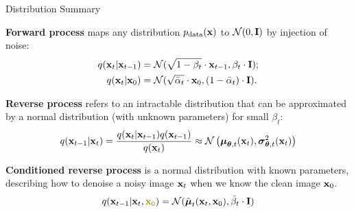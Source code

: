 \documentclass{beamer}
\renewcommand{\eqpause}{}
\begin{document}
\begin{frame}{Distribution Summary}

    \textbf{Forward process} maps any distribution $p_{\text{data}}(\mathbf{x})$ to $\mathcal{N}(0, \mathbf{I})$ by injection of noise:
    \begin{align*}
        q(\mathbf{x}_t | \mathbf{x}_{t-1}) &= \mathcal{N}(\sqrt{1 - \beta_t} \cdot \mathbf{x}_{t-1}, \beta_t \cdot \mathbf{I}); \\
        q(\mathbf{x}_t | \mathbf{x}_0) &= \mathcal{N}(\sqrt{\bar{\alpha}_t} \cdot \mathbf{x}_0, (1 - \bar{\alpha}_t) \cdot \mathbf{I}).
    \end{align*}
    \eqpause
    \textbf{Reverse process} refers to an intractable distribution that can be approximated by a normal distribution (with unknown parameters) for small $\beta_t$:
    \[
        q(\mathbf{x}_{t-1}|\mathbf{x}_{t}) = \frac{q(\mathbf{x}_{t}|\mathbf{x}_{t-1}) q(\mathbf{x}_{t-1})}{q(\mathbf{x}_{t})} \approx \mathcal{N} \left(\boldsymbol{\mu}_{\boldsymbol{\theta}, t}(\mathbf{x}_t), \boldsymbol{\sigma}_{\boldsymbol{\theta}, t}^2(\mathbf{x}_t)\right)
    \]
    \eqpause
    \textbf{Conditioned reverse process} is a normal distribution with known parameters, describing how to denoise a noisy image $\mathbf{x}_t$ when we know the clean image $\mathbf{x}_0$.
    \[
        q(\bx_{t-1}|\bx_{t}, {\color{olive}\bx_0}) = \cN(\tilde{\bmu}_t(\bx_t, \bx_0), \tilde{\beta}_t \cdot \bI)
    \]
\end{frame}
\end{document}
